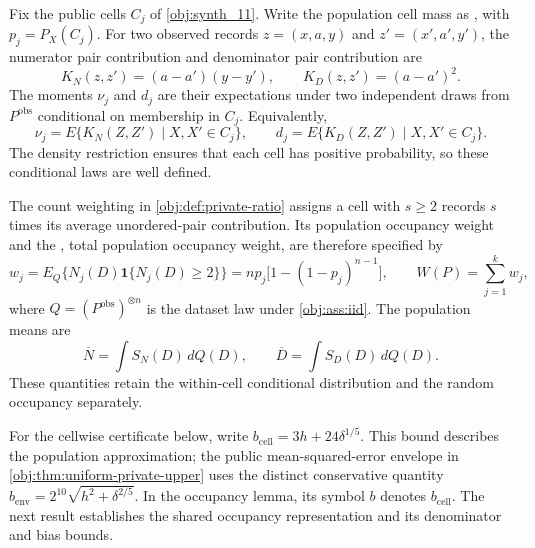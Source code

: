 \documentclass[11pt]{article}
\begin{document}
Fix the public cells \(C_j\) of \cref{obj:synth_11}. Write the population cell mass as , with \(p_j=P_X(C_j)\). For two observed records \(z=(x,a,y)\) and \(z'=(x',a',y')\), the numerator pair contribution  and denominator pair contribution  are
\[
K_N(z,z')=(a-a')(y-y'),
\qquad
K_D(z,z')=(a-a')^2.
\]
The moments \(\nu_j\) and \(d_j\) are their expectations under two independent draws from \(P^{\mathrm{obs}}\) conditional on membership in \(C_j\). Equivalently,
\[
\nu_j=E\{K_N(Z,Z')\mid X,X'\in C_j\},
\qquad
d_j=E\{K_D(Z,Z')\mid X,X'\in C_j\}.
\]
The density restriction ensures that each cell has positive probability, so these conditional laws are well defined.

The count weighting in \cref{obj:def:private-ratio} assigns a cell with \(s\ge2\) records \(s\) times its average unordered-pair contribution. Its population occupancy weight and the , total population occupancy weight, are therefore specified by
\[
w_j
=
E_Q\{N_j(D)\mathbf1\{N_j(D)\ge2\}\}
=
np_j\bigl[1-(1-p_j)^{n-1}\bigr],
\qquad
W(P)=\sum_{j=1}^k w_j,
\]
where \(Q=(P^{\mathrm{obs}})^{\otimes n}\) is the dataset law under \cref{obj:ass:iid}. The population means are
\[
\overline N=\int S_N(D)\,dQ(D),
\qquad
\overline D=\int S_D(D)\,dQ(D).
\]
These quantities retain the within-cell conditional distribution and the random occupancy separately.

For the cellwise certificate below, write \(b_{\mathrm{cell}}=3h+24\delta^{1/5}\). This bound describes the population approximation; the public mean-squared-error envelope in \cref{obj:thm:uniform-private-upper} uses the distinct conservative quantity \(b_{\mathrm{env}}=2^{10}\sqrt{h^2+\delta^{2/5}}\). In the occupancy lemma, its symbol \(b\) denotes \(b_{\mathrm{cell}}\). The next result establishes the shared occupancy representation and its denominator and bias bounds.
\end{document}
